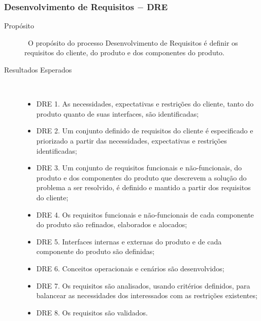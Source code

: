 \subsubsection{Desenvolvimento de Requisitos $-$ DRE}

  \begin{description}
    \item [Propósito] \
     O propósito do processo Desenvolvimento de Requisitos é definir os requisitos
     do cliente, do produto e dos componentes do produto.
    \item [Resultados Esperados]\
      \begin{itemize}
        \item DRE 1. As necessidades, expectativas e restrições do cliente, tanto do produto
              quanto de suas interfaces, são identificadas;
        \item DRE 2. Um conjunto definido de requisitos do cliente é especificado e priorizado
              a partir das necessidades, expectativas e restrições identificadas;
        \item DRE 3. Um conjunto de requisitos funcionais e não-funcionais, do produto e dos componentes
                    do produto que descrevem a solução do problema a ser resolvido, é definido e mantido
                    a partir dos requisitos do cliente;
        \item DRE 4. Os requisitos funcionais e não-funcionais de cada componente do produto são
              refinados, elaborados e alocados;
        \item DRE 5. Interfaces internas e externas do produto e de cada componente do produto são
              definidas;
        \item DRE 6. Conceitos operacionais e cenários são desenvolvidos;
        \item DRE 7. Os requisitos são analisados, usando critérios definidos, para balancear
              as necessidades dos interessados com as restrições existentes;
        \item DRE 8. Os requisitos são validados.
      \end{itemize}
  \end{description}

